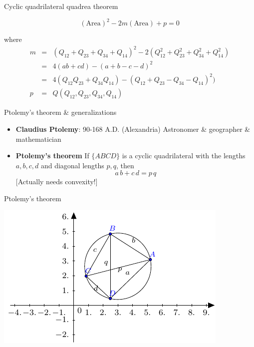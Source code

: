 \documentclass[10pt,ignorenonframetext,serif,onlymath]{beamer}
\begin{document}
\begin{frame}{Cyclic quadrilateral quadrea theorem}
\protect\hypertarget{sec:cyclic-quadrilateral-quadrea-theorem}{}

\[(\text{Area})^2 - 2 m (\text{Area}) + p = 0\]

where \[\begin{array}{lll}
    m &=& (Q_{12} + Q_{23} + Q_{34} + Q_{14})^2 - 2(Q_{12}^2 + Q_{23}^2 + Q_{34}^2 + Q_{14}^2)\\
      &=& 4(ab + cd) - (a + b - c - d)^2 \\
      &=& 4(Q_{12}Q_{23} + Q_{34}Q_{14}) - (Q_{12} + Q_{23} - Q_{34} - Q_{14})^2) \\
    p &=& Q(Q_{12}, Q_{23}, Q_{34}, Q_{14})
  \end{array}\]

\end{frame}

\begin{frame}{Ptolemy’s theorem \& generalizations}
\protect\hypertarget{sec:ptolemys-theorem-generalizations}{}

\begin{itemize}
\item
  \textbf{Claudius Ptolemy}: 90-168 A.D. (Alexandria) Astronomer \&
  geographer \& mathematician
\item
  \textbf{Ptolemy’s theorem} If \(\{ABCD\}\) is a cyclic quadrilateral
  with the lengths \(a, b, c, d\) and diagonal lengths \(p, q\), then
  \[a\,b + c\,d = p\,q\] {[}Actually needs convexity!{]}
\end{itemize}

\end{frame}

\begin{frame}{Ptolemy’s theorem}
\protect\hypertarget{sec:ptolemys-theorem}{}

\includegraphics{figs/Ptolemy.pdf}

\end{frame}
\end{document}

